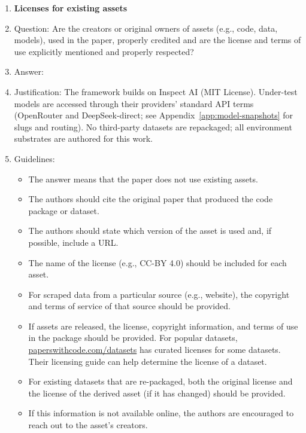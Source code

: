 \documentclass{article}
\begin{document}
\begin{enumerate}
\item {\bf Licenses for existing assets}
    \item[] Question: Are the creators or original owners of assets (e.g., code, data, models), used in the paper, properly credited and are the license and terms of use explicitly mentioned and properly respected?
    \item[] Answer: \answerYes{} %
    \item[] Justification: The framework builds on Inspect AI (MIT License). Under-test models are accessed through their providers' standard API terms (OpenRouter and DeepSeek-direct; see Appendix~\ref{app:model-snapshots} for slugs and routing). No third-party datasets are repackaged; all environment substrates are authored for this work.
    \item[] Guidelines:
    \begin{itemize}
        \item The answer \answerNA{} means that the paper does not use existing assets.
        \item The authors should cite the original paper that produced the code package or dataset.
        \item The authors should state which version of the asset is used and, if possible, include a URL.
        \item The name of the license (e.g., CC-BY 4.0) should be included for each asset.
        \item For scraped data from a particular source (e.g., website), the copyright and terms of service of that source should be provided.
        \item If assets are released, the license, copyright information, and terms of use in the package should be provided. For popular datasets, \url{paperswithcode.com/datasets} has curated licenses for some datasets. Their licensing guide can help determine the license of a dataset.
        \item For existing datasets that are re-packaged, both the original license and the license of the derived asset (if it has changed) should be provided.
        \item If this information is not available online, the authors are encouraged to reach out to the asset's creators.
    \end{itemize}


\end{enumerate}
\end{document}

